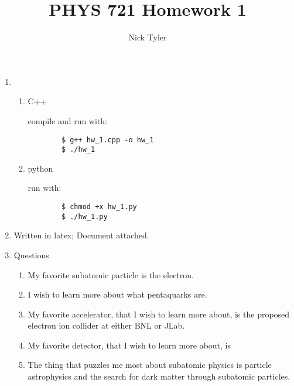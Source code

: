 \documentclass[pdftex]{article}
\title{PHYS 721 Homework 1}
\author{Nick Tyler}
\date{}
\begin{document}
\maketitle
\begin{enumerate}
	\item 
	\begin{enumerate}
		\item C++
		
		compile and run with:
		\begin{verbatim}
		$ g++ hw_1.cpp -o hw_1
		$ ./hw_1
		\end{verbatim}

		\item python
		
		run with:
		\begin{verbatim}
		$ chmod +x hw_1.py
		$ ./hw_1.py
		\end{verbatim}
	\end{enumerate}
	\item Written in latex; Document attached.
	\item Questions
	\begin{enumerate}
		\item My favorite subatomic particle is the electron.
		\item I wish to learn more about what pentaquarks are.
		\item My favorite accelerator, that I wish to learn more about, is the proposed electron ion collider at either BNL or JLab.
		\item My favorite detector, that I wish to learn more about, is 
		\item The thing that puzzles me most about subatomic physics is particle astrophysics and the search for dark matter through subatomic particles.
	\end{enumerate}

\end{enumerate}
\end{document}
